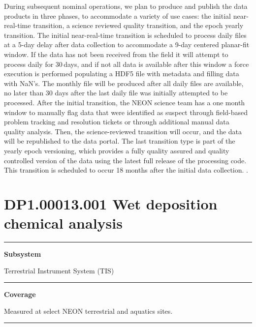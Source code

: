\documentclass[]{article}
\begin{document}
During subsequent nominal operations, we plan to produce and publish the
data products in three phases, to accommodate a variety of use cases:
the initial near-real-time transition, a science reviewed quality
transition, and the epoch yearly transition. The initial near-real-time
transition is scheduled to process daily files at a 5-day delay after
data collection to accommodate a 9-day centered planar-fit window. If
the data has not been received from the field it will attempt to process
daily for 30\,days, and if not all data is available after this window a
force execution is performed populating a HDF5 file with metadata and
filling data with NaN's. The monthly file will be produced after all
daily files are available, no later than 30 days after the last daily
file was initially attempted to be processed. After the initial
transition, the NEON science team has a one month window to manually
flag data that were identified as suspect through field-based problem
tracking and resolution tickets or through additional manual data
quality analysis. Then, the science-reviewed transition will occur, and
the data will be republished to the data portal. The last transition
type is part of the yearly epoch versioning, which provides a fully
quality assured and quality controlled version of the data using the
latest full release of the processing code. This transition is scheduled
to occur 18 months after the initial data collection. \newpage
.

\section{DP1.00013.001 Wet deposition chemical
analysis}\label{dp1.00013.001-wet-deposition-chemical-analysis}

\begin{center}\rule{0.5\linewidth}{\linethickness}\end{center}

\textbf{Subsystem}

Terrestrial Instrument System (TIS)

\begin{center}\rule{0.5\linewidth}{\linethickness}\end{center}

\textbf{Coverage}

Measured at select NEON terrestrial and aquatics sites.

\begin{center}\rule{0.5\linewidth}{\linethickness}\end{center}
\end{document}
